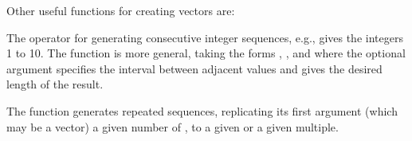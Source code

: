 Other useful functions for creating vectors are:
\begin{itemize*}
  \item The \code{:} operator for generating consecutive integer sequences, e.g.,
   gives the integers 1 to 10.  The  function is more general, taking the forms
,
, and
 where the optional argument  specifies the interval between adjacent values and  gives the desired length of the
result.

  \item The  function generates repeated sequences, replicating
  its first argument (which may be a vector) a given number of ,
  to a given  or  a given multiple.
\end{itemize*}

